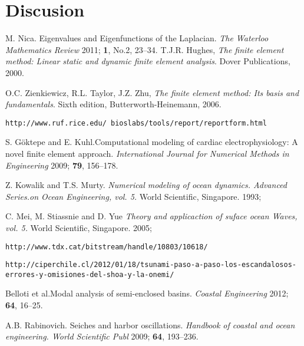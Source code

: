 \documentclass[12pt, letterpaper]{article}
\begin{document}
\section{Discusion}



\begin{thebibliography}{10}

  M. Nica. Eigenvalues and Eigenfunctions of the Laplacian. \emph{The Waterloo Mathematics Review} 2011; {\bf 1}, No.2, 23--34.
  T.J.R. Hughes, \emph{The finite element method: Linear static and dynamic finite element analysis}. Dover Publications, 2000.
  
  O.C. Zienkiewicz, R.L. Taylor, J.Z. Zhu, \emph{The finite element method: Its basis and fundamentals}. Sixth edition, Butterworth-Heinemann, 2006.  

 {\tt http://www.ruf.rice.edu/~bioslabs/tools/report/reportform.html }

	S. G\"{o}ktepe and E. Kuhl.Computational modeling of cardiac electrophysiology: A novel finite element approach. \emph{International Journal for Numerical Methods in Engineering} 2009; {\bf 79}, 156--178.
	
	Z. Kowalik and T.S. Murty. \emph{Numerical modeling of ocean dynamics. Advanced Series.on Ocean Engineering, vol. 5. }World Scientific, Singapore. 1993; 
	
	C. Mei, M. Stiassnie and D. Yue \emph{Theory and applicaction of suface ocean Waves, vol. 5. }World Scientific, Singapore. 2005; 

 {\tt http://www.tdx.cat/bitstream/handle/10803/10618/}

 {\tt http://ciperchile.cl/2012/01/18/tsunami-paso-a-paso-los-escandalosos-errores-y-omisiones-del-shoa-y-la-onemi/
}

	Belloti et al.Modal analysis of semi-enclosed basins. \emph{Coastal Engineering} 2012; {\bf 64}, 16--25.

	A.B. Rabinovich. Seiches and harbor oscillations. \emph{Handbook of coastal and ocean engineering. World Scientific Publ} 2009; {\bf 64}, 193--236.



\end{thebibliography}
\end{document}
